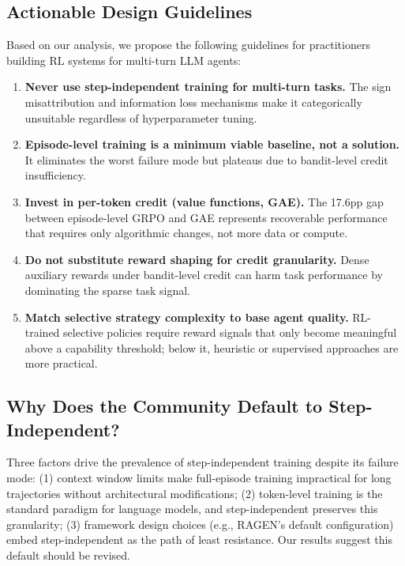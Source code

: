 \documentclass{article}
\begin{document}
\subsection{Actionable Design Guidelines}

Based on our analysis, we propose the following guidelines for practitioners building RL systems for multi-turn LLM agents:

\begin{enumerate}
    \item \textbf{Never use step-independent training for multi-turn tasks.} The sign misattribution and information loss mechanisms make it categorically unsuitable regardless of hyperparameter tuning.
    \item \textbf{Episode-level training is a minimum viable baseline, not a solution.} It eliminates the worst failure mode but plateaus due to bandit-level credit insufficiency.
    \item \textbf{Invest in per-token credit (value functions, GAE).} The 17.6pp gap between episode-level GRPO and GAE represents recoverable performance that requires only algorithmic changes, not more data or compute.
    \item \textbf{Do not substitute reward shaping for credit granularity.} Dense auxiliary rewards under bandit-level credit can harm task performance by dominating the sparse task signal.
    \item \textbf{Match selective strategy complexity to base agent quality.} RL-trained selective policies require reward signals that only become meaningful above a capability threshold; below it, heuristic or supervised approaches are more practical.
\end{enumerate}

\subsection{Why Does the Community Default to Step-Independent?}

Three factors drive the prevalence of step-independent training despite its failure mode: (1) context window limits make full-episode training impractical for long trajectories without architectural modifications; (2) token-level training is the standard paradigm for language models, and step-independent preserves this granularity; (3) framework design choices (e.g., RAGEN's default configuration) embed step-independent as the path of least resistance. Our results suggest this default should be revised.
\end{document}
